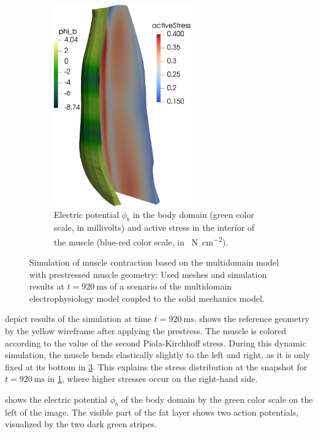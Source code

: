 \begin{figure}
\begin{subfigure}[t]{0.31\textwidth}
    \label{fig:multidomain_prestretch6}%
  \end{subfigure}\qquad
  \begin{subfigure}[t]{0.31\textwidth}%
    \centering%
    \includegraphics[height=87mm]{images/results/application/multidomain_prestretch2.png}%
    \caption{Electric potential $\phi_b$ in the body domain (green color scale, in millivolts) and active stress in the interior of the muscle (blue-red color scale, in \SI{}{\newton\per\centi\meter\squared}).}%
    \label{fig:multidomain_prestretch2}%
  \end{subfigure}
  \hfill
  \caption{Simulation of muscle contraction based on the multidomain model with prestressed muscle geometry: Used meshes and simulation results at $t=\SI{920}{\ms}$ of a scenario of the multidomain electrophysiology model coupled to the solid mechanics model.}%
  \label{fig:multidomain_prestretch}%
\end{figure}%

 depict results of the simulation at time $t=\SI{920}{\milli\second}$. 
 shows the reference geometry by the yellow wireframe after applying the prestress. The muscle is colored according to the value of the second Piola-Kirchhoff stress. During this dynamic simulation, the muscle bends elastically slightly to the left and right, as it is only fixed at its bottom in \cref{fig:multidomain_prestretch}. This explains the stress distribution at the snapshot for $t=\SI{920}{\milli\second}$ in \cref{fig:multidomain_prestretch6}, where higher stresses occur on the right-hand side.

 shows the electric potential $\phi_b$ of the body domain by the green color scale on the left of the image. The visible part of the fat layer shows two action potentials, visualized by the two dark green stripes.

